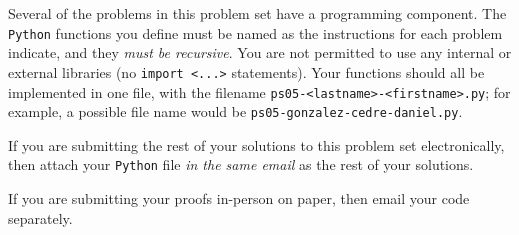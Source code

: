 \begin{case}
    Several of the problems in this problem set have a programming component.
    The \texttt{Python} functions you define
    must be named as the instructions for each problem indicate,
    and they \emph{must be recursive}.
    You are not permitted to use any internal or external libraries
    (\ie no \texttt{import <...>} statements).
    Your functions should all be implemented in one file,
    with the filename \texttt{ps05-<lastname>-<firstname>.py};
    for example, a possible file name would be \texttt{ps05-gonzalez-cedre-daniel.py}.

    If you are submitting the rest of your solutions to this problem set electronically,
    then attach your \texttt{Python} file \emph{in the same email}
    as the rest of your solutions.

    If you are submitting your proofs in-person on paper, then email your code separately.
\end{case}


